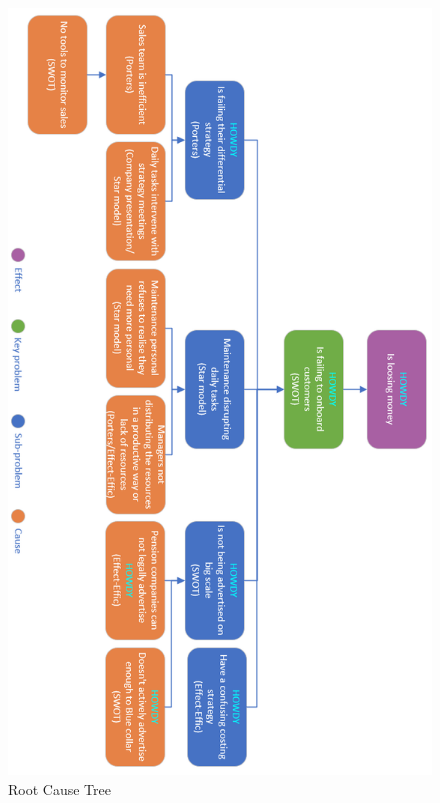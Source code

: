 \begin{figure}[H]
\includegraphics[scale=0.74]{figures/rootcause_scrnshot.png}
\caption{Root Cause Tree}
\label{rootcausetree}
\centering
\end{figure}

